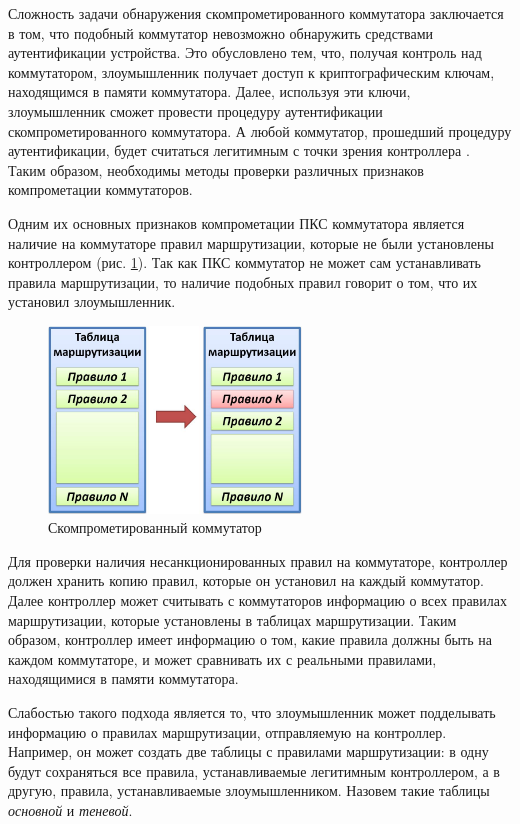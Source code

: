 \documentclass[../thesis.tex]{subfiles}
\begin{document}
Сложность задачи обнаружения скомпрометированного коммутатора заключается в том, что подобный коммутатор невозможно обнаружить средствами аутентификации устройства.
Это обусловлено тем, что, получая контроль над коммутатором, злоумышленник получает доступ к криптографическим ключам, находящимся в памяти коммутатора.
Далее, используя эти ключи, злоумышленник сможет провести процедуру аутентификации скомпрометированного коммутатора.
А любой коммутатор, прошедший процедуру аутентификации, будет считаться легитимным с точки зрения контроллера \cite{openflow15}.
Таким образом, необходимы методы проверки различных признаков компрометации коммутаторов.

Одним их основных признаков компрометации ПКС коммутатора является наличие на коммутаторе правил маршрутизации, которые не были установлены контроллером \cite{dhawan2015sphinx} (рис. \ref{fig:comprimizedswitch}).
Так как ПКС коммутатор не может сам устанавливать правила маршрутизации, то наличие подобных правил говорит о том, что их установил злоумышленник.

\begin{figure}
\centering
\includegraphics[width=0.6\textwidth]{figures/comprimizedswitch.jpg}
\caption{Скомпрометированный коммутатор} \label{fig:comprimizedswitch}
\end{figure}

Для проверки наличия несанкционированных правил на коммутаторе, контроллер должен хранить копию правил, которые он установил на каждый коммутатор.
Далее контроллер может считывать с коммутаторов информацию о всех правилах маршрутизации, которые установлены в таблицах маршрутизации.
Таким образом, контроллер имеет информацию о том, какие правила должны быть на каждом коммутаторе, и может сравнивать их с реальными правилами, находящимися в памяти коммутатора.

Слабостью такого подхода является то, что злоумышленник может подделывать информацию о правилах маршрутизации, отправляемую на контроллер.
Например, он может создать две таблицы с правилами маршрутизации: в одну будут сохраняться все правила, устанавливаемые легитимным контроллером, а в другую, правила, устанавливаемые злоумышленником.
Назовем такие таблицы \textit{основной} и \textit{теневой}.
\end{document}
